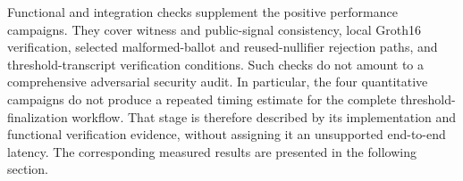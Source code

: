 Functional and integration checks supplement the positive
performance campaigns. They cover witness and public-signal
consistency, local Groth16 verification, selected malformed-ballot
and reused-nullifier rejection paths, and threshold-transcript
verification conditions. Such checks do not amount to a
comprehensive adversarial security audit. In particular, the
four quantitative campaigns do not produce a repeated timing
estimate for the complete threshold-finalization workflow.
That stage is therefore described by its implementation and
functional verification evidence, without assigning it an
unsupported end-to-end latency. The corresponding measured
results are presented in the following section.
